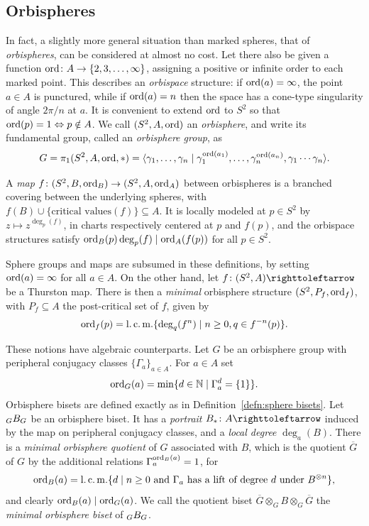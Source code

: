 \documentclass{amsart}
\begin{document}
\subsection{Orbispheres}\label{ss:orbispheres}
In fact, a slightly more general situation than marked spheres, that
of \emph{orbispheres}, can be considered at almost no cost. Let there
also be given a function $\operatorname{ord}\colon A\to\{2,3,\dots,\infty\}$,
assigning a positive or infinite order to each marked point. This
describes an \emph{orbispace} structure: if $\operatorname{ord}(a)=\infty$, the
point $a\in A$ is punctured, while if $\operatorname{ord}(a)=n$ then the space has a
cone-type singularity of angle $2\pi/n$ at $a$. It is convenient to
extend $\operatorname{ord}$ to $S^2$ so that $\operatorname{ord}(p)=1\Leftrightarrow p\notin A$.
We call $(S^2,A,\operatorname{ord})$ an \emph{orbisphere}, and write its fundamental
group, called an \emph{orbisphere group}, as
\begin{equation}\label{eq:orbispheregp}
  G=\pi_1(S^2,A,\operatorname{ord},*)=\langle \gamma_1,\dots,\gamma_n\mid \gamma_1^{\operatorname{ord}(a_1)},\dots,\gamma_n^{\operatorname{ord}(a_n)}, \gamma_1\cdots\gamma_n\rangle.
\end{equation}

A \emph{map} $f\colon(S^2,B,\operatorname{ord}_B)\to(S^2,A,\operatorname{ord}_A)$ between
orbispheres is a branched covering between the underlying spheres,
with $f(B)\cup\{\text{critical values}(f)\}\subseteq A$. It is locally
modeled at $p\in S^2$ by $z\mapsto z^{\deg_p(f)}$, in charts
respectively centered at $p$ and $f(p)$, and the orbispace structures
satisfy $\operatorname{ord}_B(p)\deg_p(f)\mid\operatorname{ord}_A(f(p))$ for all $p\in S^2$.

Sphere groups and maps are subsumed in these definitions, by setting
$\operatorname{ord}(a)=\infty$ for all $a\in A$. On the other hand, let
$f\colon(S^2,A)\selfmap$ be a Thurston map. There is then a
\emph{minimal} orbisphere structure $(S^2,P_f,\operatorname{ord}_f)$, with
$P_f\subseteq A$ the post-critical set of $f$, given by
\[\operatorname{ord}_f(p)=\operatorname{l.c.m.}\{\deg_q(f^n)\mid n\ge0,q\in f^{-n}(p)\}.\]

These notions have algebraic counterparts. Let $G$ be an orbisphere
group with peripheral conjugacy classes $\{\Gamma_a\}_{a\in A}$. For $a\in
A$ set
\[\operatorname{ord}_G(a)=\min\{d\in {\mathbb N}\mid\Gamma^d_a=\{1\}\}.\]
Orbisphere bisets are defined exactly as in
Definition~\ref{defn:sphere bisets}. Let $\subscript GB_G$ be an
orbisphere biset. It has a \emph{portrait} $B_*\colon A\selfmap$
induced by the map on peripheral conjugacy classes, and a \emph{local
  degree} $\deg_a(B)$. There is a \emph{minimal orbisphere quotient}
of $G$ associated with $B$, which is the quotient $\overline G$ of $G$
by the additional relations $\Gamma_a^{\operatorname{ord}_B(a)}=1$, for
\begin{equation}\label{eq:ordB}
  \operatorname{ord}_B(a)=\operatorname{l.c.m.}\{d\mid n\ge0\text{ and $\Gamma_a$ has a lift of degree $d$ under }B^{\otimes n}\},
\end{equation}
and clearly $\operatorname{ord}_{B}(a) \mid \operatorname{ord}_{G}(a)$. We call the quotient biset
$\overline G\otimes_G B\otimes_G\overline G$ the \emph{minimal
  orbisphere biset} of $\subscript GB_G$.
\end{document}
